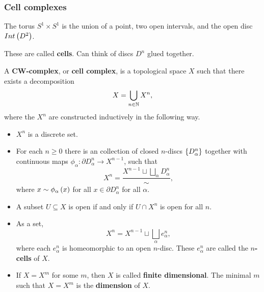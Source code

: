\subsubsection{Cell complexes}

\begin{example*}
The torus $ S^1 \times S^1 $ is the union of a point, two open intervals, and the open disc $ Int\left( D^2 \right) $.
\end{example*}

These are called \textbf{cells}. Can think of discs $ D^n $ glued together.


\begin{definition*}
A \textbf{CW-complex}, or \textbf{cell complex}, is a topological space $ X $ such that there exists a decomposition
$$ X = \bigcup_{n \in \mathbb{N}} X^n, $$
where the $ X^n $ are constructed inductively in the following way.
\begin{itemize}
\item $ X^n $ is a discrete set.
\item For each $ n \ge 0 $ there is an collection of closed $ n $-discs $ \left\{ D_\alpha^n \right\} $ together with continuous maps $ \phi_\alpha : \partial D_\alpha^n \to X^{n - 1} $, such that
$$ X^n = \dfrac{X^{n - 1} \sqcup \bigsqcup_\alpha D_\alpha^n}{\sim}, $$
where $ x \sim \phi_\alpha\left( x \right) $ for all $ x \in \partial D_\alpha^n $ for all $ \alpha $.
\item A subset $ U \subseteq X $ is open if and only if $ U \cap X^n $ is open for all $ n $.
\end{itemize}
\end{definition*}

\begin{remark*}
\hfill
\begin{itemize}
\item As a set,
$$ X^n = X^{n - 1} \sqcup \bigsqcup_\alpha e_\alpha^n, $$
where each $ e_\alpha^n $ is homeomorphic to an open $ n $-disc. These $ e_\alpha^n $ are called the \textbf{$ n $-cells} of $ X $.
\item If $ X = X^m $ for some $ m $, then $ X $ is called \textbf{finite dimensional}. The minimal $ m $ such that $ X = X^m $ is the \textbf{dimension} of $ X $.
\end{itemize}
\end{remark*}

